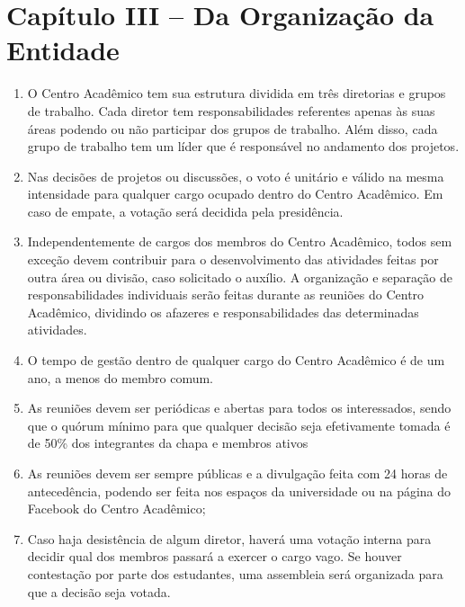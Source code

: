 \documentclass[12pt]{article}
\begin{document}
\section{Capítulo III -- Da Organização da Entidade}
    \begin{enumerate}[label=\S\,\arabic*$^\circ$]
        \item{O Centro Acadêmico tem sua estrutura dividida em três diretorias
            e grupos de trabalho. Cada diretor tem responsabilidades referentes
            apenas às suas áreas podendo ou não participar dos grupos de
            trabalho. Além disso, cada grupo de trabalho tem um líder que é
            responsável no andamento dos projetos.}
        \item{Nas decisões de projetos ou discussões, o voto é unitário e
            válido na mesma intensidade para qualquer cargo ocupado dentro do
            Centro Acadêmico. Em caso de empate, a votação será decidida pela
            presidência.}
        \item{Independentemente de cargos dos membros do Centro Acadêmico,
            todos sem exceção devem contribuir para o desenvolvimento das
            atividades feitas por outra área ou divisão, caso solicitado o
            auxílio. A organização e separação de responsabilidades individuais
            serão feitas durante as reuniões do Centro Acadêmico, dividindo os
            afazeres e responsabilidades das determinadas atividades.}
        \item{O tempo de gestão dentro de qualquer cargo do Centro Acadêmico é de um ano, a menos do membro comum.}
        \item{As reuniões devem ser periódicas e abertas para todos os
            interessados, sendo que o quórum mínimo para que qualquer decisão
            seja efetivamente tomada é de 50\% dos integrantes da chapa e
            membros ativos}
        \item{As reuniões devem ser sempre públicas e a divulgação feita com 24
            horas de antecedência, podendo ser feita nos espaços da
            universidade ou na página do Facebook do Centro Acadêmico;}
        \item{Caso haja desistência de algum diretor, haverá uma votação
            interna para decidir qual dos membros passará a exercer o cargo
            vago. Se houver contestação por parte dos estudantes, uma
            assembleia será organizada para que a decisão seja votada. }
    \end{enumerate}
\end{document}
